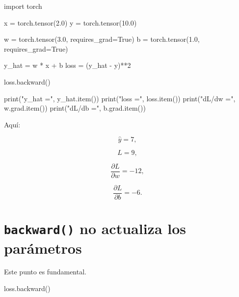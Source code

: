 \documentclass[
  letterpaper,
  DIV=11,
  numbers=noendperiod]{scrartcl}
\newenvironment{Shaded}{\begin{snugshade}}{\end{snugshade}}
\newcommand{\BuiltInTok}[1]{\textcolor[rgb]{0.00,0.23,0.31}{#1}}
\newcommand{\DecValTok}[1]{\textcolor[rgb]{0.68,0.00,0.00}{#1}}
\newcommand{\FloatTok}[1]{\textcolor[rgb]{0.68,0.00,0.00}{#1}}
\newcommand{\ImportTok}[1]{\textcolor[rgb]{0.00,0.46,0.62}{#1}}
\newcommand{\NormalTok}[1]{\textcolor[rgb]{0.00,0.23,0.31}{#1}}
\newcommand{\OperatorTok}[1]{\textcolor[rgb]{0.37,0.37,0.37}{#1}}
\newcommand{\StringTok}[1]{\textcolor[rgb]{0.13,0.47,0.30}{#1}}
\newcommand{\VariableTok}[1]{\textcolor[rgb]{0.07,0.07,0.07}{#1}}
\begin{document}
\protect{}\label{autograd-simple}
\begin{Shaded}
\begin{Highlighting}[]
\ImportTok{import}\NormalTok{ torch}

\NormalTok{x }\OperatorTok{=}\NormalTok{ torch.tensor(}\FloatTok{2.0}\NormalTok{)}
\NormalTok{y }\OperatorTok{=}\NormalTok{ torch.tensor(}\FloatTok{10.0}\NormalTok{)}

\NormalTok{w }\OperatorTok{=}\NormalTok{ torch.tensor(}\FloatTok{3.0}\NormalTok{, requires\_grad}\OperatorTok{=}\VariableTok{True}\NormalTok{)}
\NormalTok{b }\OperatorTok{=}\NormalTok{ torch.tensor(}\FloatTok{1.0}\NormalTok{, requires\_grad}\OperatorTok{=}\VariableTok{True}\NormalTok{)}

\NormalTok{y\_hat }\OperatorTok{=}\NormalTok{ w }\OperatorTok{*}\NormalTok{ x }\OperatorTok{+}\NormalTok{ b}
\NormalTok{loss }\OperatorTok{=}\NormalTok{ (y\_hat }\OperatorTok{{-}}\NormalTok{ y)}\OperatorTok{**}\DecValTok{2}

\NormalTok{loss.backward()}

\BuiltInTok{print}\NormalTok{(}\StringTok{"y\_hat ="}\NormalTok{, y\_hat.item())}
\BuiltInTok{print}\NormalTok{(}\StringTok{"loss  ="}\NormalTok{, loss.item())}
\BuiltInTok{print}\NormalTok{(}\StringTok{"dL/dw ="}\NormalTok{, w.grad.item())}
\BuiltInTok{print}\NormalTok{(}\StringTok{"dL/db ="}\NormalTok{, b.grad.item())}
\end{Highlighting}
\end{Shaded}

Aquí:

\[
\hat y=7,
\]

\[
L=9,
\]

\[
\frac{\partial L}{\partial w}=-12,
\]

\[
\frac{\partial L}{\partial b}=-6.
\]

\section{\texorpdfstring{\texttt{backward()} no actualiza los
parámetros}{backward() no actualiza los parámetros}}\label{backward-no-actualiza-los-paruxe1metros}

Este punto es fundamental.

\begin{Shaded}
\begin{Highlighting}[]
\NormalTok{loss.backward()}
\end{Highlighting}
\end{Shaded}
\end{document}
